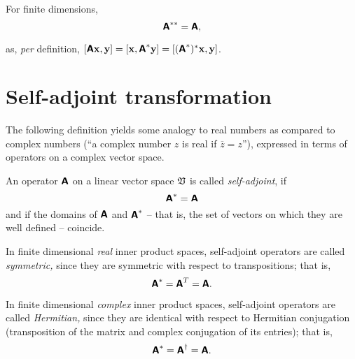 For finite dimensions,
\begin{equation}
\textsf{\textbf{A}}^{\ast \ast}=
\textsf{\textbf{A}},
\end{equation}

{\color{OliveGreen}\bproof
as, {\it per} definition,
$
[\textsf{\textbf{A}}{\bf x}, {\bf y}]
=
[{\bf x}, \textsf{\textbf{A}}^\ast{\bf y}]
=
[(\textsf{\textbf{A}}^\ast)^\ast{\bf x}, {\bf y}]
$.
\eproof
}


\section{Self-adjoint transformation}
\label{2015-m-ch-fdlvs-self-adjoint}



The following definition yields some analogy to real numbers as compared to complex numbers
(``a complex number $z$ is real if $\overline{z}=z$''),
expressed in terms of operators on a complex vector space.


An operator    $\textsf{\textbf{A}}$   on a linear vector space   ${\frak V}$
is called {\em self-adjoint}, if
\begin{equation}
\textsf{\textbf{A}}^{\ast}=
\textsf{\textbf{A}}
\end{equation}
and if the domains of $\textsf{\textbf{A}}$ and $\textsf{\textbf{A}}^{\ast}$
-- that is, the set of vectors on which they are well defined -- coincide.

In finite dimensional {\em real} inner product spaces,
self-adjoint operators are called {\em symmetric,}
since they are symmetric with respect to transpositions; that is,
\begin{equation}
\textsf{\textbf{A}}^{\ast}= \textsf{\textbf{A}}^{T}=
\textsf{\textbf{A}}.
\end{equation}

In finite dimensional
{\em complex} inner product spaces,
self-adjoint operators are called {\em Hermitian,}
since they are identical with respect to Hermitian conjugation (transposition of the matrix and complex conjugation of its
entries); that is,
\begin{equation}
\textsf{\textbf{A}}^{\ast}= \textsf{\textbf{A}}^{\dagger}=
\textsf{\textbf{A}}.
\end{equation}

